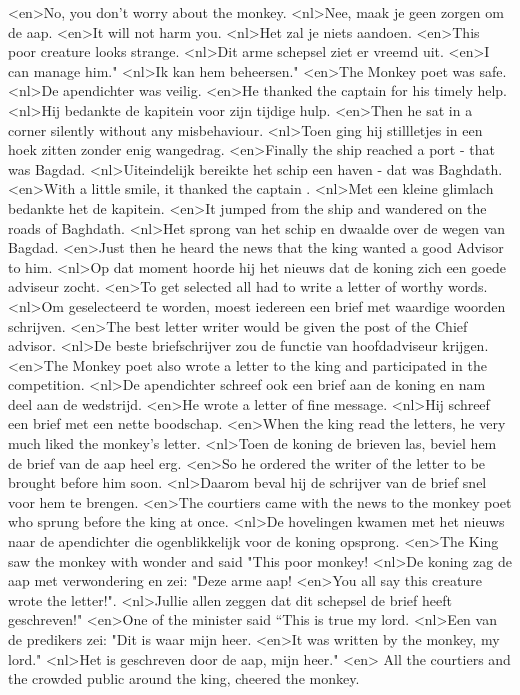 <en>No, you don’t worry about the monkey.
<nl>Nee, maak je geen zorgen om de aap.
<en>It will not harm you.
<nl>Het zal je niets aandoen.
<en>This poor creature looks strange.
<nl>Dit arme schepsel ziet er vreemd uit.
<en>I can manage him."
<nl>Ik kan hem beheersen."
<en>The Monkey poet was safe.
<nl>De apendichter was veilig.
<en>He thanked the captain for his timely help.
<nl>Hij bedankte de kapitein voor zijn tijdige hulp.
<en>Then he sat in a corner silently without any misbehaviour.
<nl>Toen ging hij stillletjes in een hoek zitten zonder enig wangedrag.
<en>Finally the ship reached a port - that was Bagdad.
<nl>Uiteindelijk bereikte het schip een haven - dat was Baghdath.
<en>With a little smile, it thanked the captain .
<nl>Met een kleine glimlach bedankte het de kapitein.
<en>It jumped from the ship and wandered on the roads of Baghdath.
<nl>Het sprong van het schip en dwaalde over de wegen van Bagdad.
<en>Just then he heard the news that the king wanted a good Advisor to him.
<nl>Op dat moment hoorde hij het nieuws dat de koning zich een goede adviseur zocht.
<en>To get selected all had to write a letter of worthy words.
<nl>Om geselecteerd te worden, moest iedereen een brief met waardige woorden schrijven.
<en>The best letter writer would be given the post of the Chief advisor.
<nl>De beste briefschrijver zou de functie van hoofdadviseur krijgen.
<en>The Monkey poet also wrote a letter to the king and participated in the competition.
<nl>De apendichter schreef ook een brief aan de koning en nam deel aan de wedstrijd.
<en>He wrote a letter of fine message.
<nl>Hij schreef een brief met een nette boodschap.
<en>When the king read the letters, he very much liked the monkey's letter.
<nl>Toen de koning de brieven las, beviel hem de brief van de aap heel erg.
<en>So he ordered the writer of the letter to be brought before him soon.
<nl>Daarom beval hij de schrijver van de brief snel voor hem te brengen.
<en>The courtiers came with the news to the monkey poet who sprung before the king at once.
<nl>De hovelingen kwamen met het nieuws naar de apendichter die ogenblikkelijk voor de koning opsprong.
<en>The King saw the monkey with wonder and said "This poor monkey!
<nl>De koning zag de aap met verwondering en zei: "Deze arme aap!
<en>You all say this creature wrote the letter!".
<nl>Jullie allen zeggen dat dit schepsel de brief heeft geschreven!"
<en>One of the minister said “This is true my lord.
<nl>Een van de predikers zei: "Dit is waar mijn heer.
<en>It was written by the monkey, my lord."
<nl>Het is geschreven door de aap, mijn heer."
<en> All the courtiers and the crowded public around the king, cheered the monkey.
